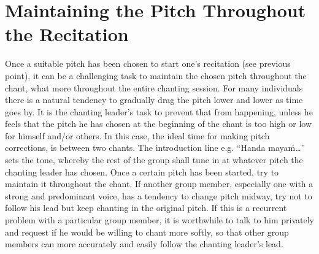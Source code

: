 \section{Maintaining the Pitch Throughout the Recitation}
Once a suitable pitch has been chosen to start one’s recitation (see previous point), it can be a challenging task to maintain the chosen pitch throughout the chant, what more throughout the entire chanting session. For many individuals there is a natural tendency to gradually drag the pitch lower and lower as time goes by. It is the chanting leader’s task to prevent that from happening, unless he feels that the pitch he has chosen at the beginning of the chant is too high or low for himself and/or others. In this case, the ideal time for making pitch corrections, is between two chants. The introduction line e.g. “Handa mayaṁ…” sets the tone, whereby the rest of the group shall tune in at whatever pitch the chanting leader has chosen. Once a certain pitch has been started, try to maintain it throughout the chant. If another group member, especially one with a strong and predominant voice, has a tendency to change pitch midway, try not to follow his lead but keep chanting in the original pitch. If this is a recurrent problem with a particular group member, it is worthwhile to talk to him privately and request if he would be willing to chant more softly, so that other group members can more accurately and easily follow the chanting leader’s lead.\\

